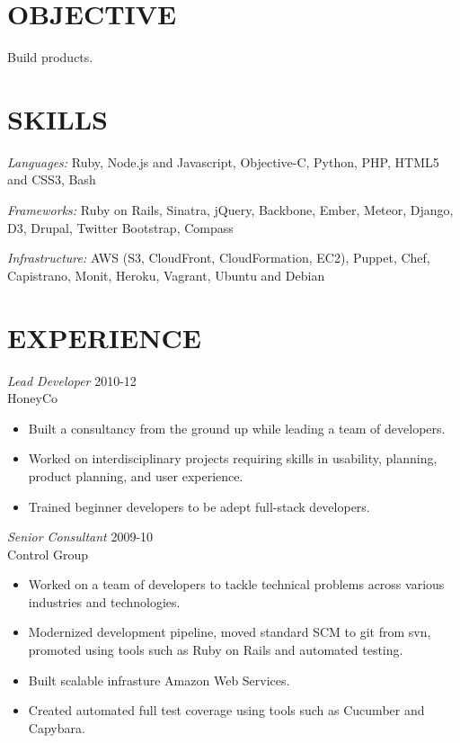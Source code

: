 \documentclass[line,margin]{res}
\begin{document}
\address{q.shanahan@gmail.com}
\address{(641) 233-1123}


\begin{resume}

\section{OBJECTIVE}
    Build products.

\section{SKILLS}
    {\sl Languages:}
        Ruby, Node.js and Javascript,
        Objective-C, Python, PHP, HTML5 and CSS3, Bash

    {\sl Frameworks:}
        Ruby on Rails, Sinatra, jQuery, Backbone, Ember, Meteor,
        Django, D3, Drupal, Twitter Bootstrap, Compass

    {\sl Infrastructure:}
        AWS (S3, CloudFront, CloudFormation, EC2), Puppet,
        Chef, Capistrano, Monit, Heroku, Vagrant, Ubuntu and Debian

\section{EXPERIENCE}
    {\sl Lead Developer}
    \hfill 2010-12 \\
    HoneyCo
    \begin{itemize} \itemsep -2pt
        \item
            Built a consultancy from the ground up while leading
            a team of developers.
        \item
            Worked on interdisciplinary projects requiring skills in
            usability, planning, product planning, and user experience.
        \item
            Trained beginner developers to be adept full-stack developers.
    \end{itemize}

    {\sl Senior Consultant}
    \hfill 2009-10 \\
    Control Group
    \begin{itemize} \itemsep -2pt
        \item
            Worked on a team of developers to tackle technical problems across
            various industries and technologies.
        \item
            Modernized development pipeline, moved standard SCM to git from svn,
            promoted using tools such as Ruby on Rails and automated testing.
        \item
            Built scalable infrasture Amazon Web Services.
        \item
            Created automated full test coverage using tools such as Cucumber and
            Capybara.
    \end{itemize}


\end{resume}
\end{document}
